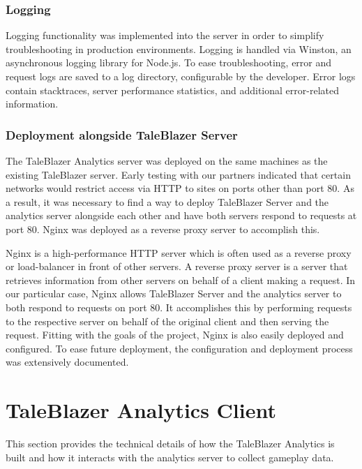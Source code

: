 \subsubsection{Logging}

Logging functionality was implemented into the server in order to simplify troubleshooting in production environments. Logging is handled via Winston, an asynchronous logging library for Node.js. To ease troubleshooting, error and request logs are saved to a log directory, configurable by the developer. Error logs contain stacktraces, server performance statistics, and additional error-related information.

\subsubsection{Deployment alongside TaleBlazer Server}

The TaleBlazer Analytics server was deployed on the same machines as the existing TaleBlazer server. Early testing with our partners indicated that certain networks would restrict access via HTTP to sites on ports other than port 80. As a result, it was necessary to find a way to deploy TaleBlazer Server and the analytics server alongside each other and have both servers respond to requests at port 80. Nginx was deployed as a reverse proxy server to accomplish this. 

Nginx is a high-performance HTTP server which is often used as a reverse proxy or load-balancer in front of other servers. A reverse proxy server is a server that retrieves information from other servers on behalf of a client making a request. In our particular case, Nginx allows TaleBlazer Server and the analytics server to both respond to requests on port 80. It accomplishes this by performing requests to the respective server on behalf of the original client and then serving the request. Fitting with the goals of the project, Nginx is also easily deployed and configured. To ease future deployment, the configuration and deployment process was extensively documented.

\section{TaleBlazer Analytics Client}

This section provides the technical details of how the TaleBlazer Analytics is built and how it interacts with the analytics server to collect gameplay data. 

